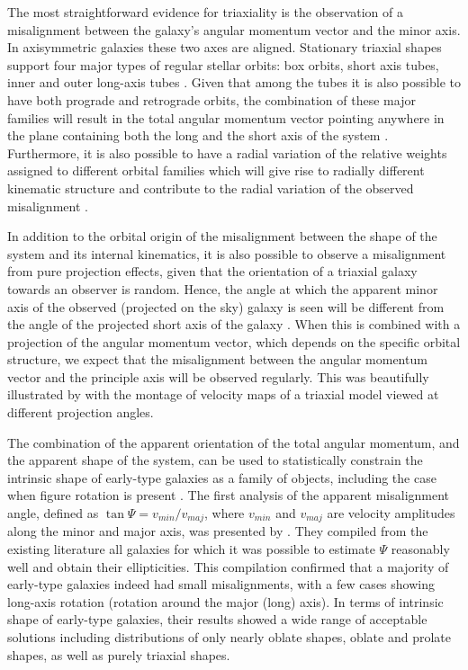 \documentclass[usenatbib,usegraphicx]{mn2e}
\begin{document}
The most straightforward evidence for triaxiality is the observation of a misalignment between the galaxy's angular momentum vector and the minor axis. In axisymmetric galaxies these two axes are aligned. Stationary triaxial shapes support four major types of regular stellar orbits: box orbits, short axis tubes, inner and outer long-axis tubes \citep{1985MNRAS.216..273D}. Given that among the tubes it is also possible to have both prograde and retrograde orbits, the combination of these major families will result in the total angular momentum vector pointing anywhere in the plane containing both the long and the short axis of the system \citep[e.g.][]{1987ApJ...321..113S}. Furthermore, it is also possible to have a radial variation of the relative weights assigned to different orbital families which will give rise to radially different kinematic structure and contribute to the radial variation of the observed misalignment \citep[see][for a detailed orbital analysis of a triaxial system]{2008MNRAS.385..647V}. 

In addition to the orbital origin of the misalignment between the shape of the system and its internal kinematics, it is also possible to observe a misalignment from pure projection effects, given that the orientation of a triaxial galaxy towards an observer is random. Hence, the angle at which the apparent minor axis of the observed (projected on the sky) galaxy is seen will be different from the angle of the projected short axis of the galaxy \citep{1956ZA.....39..126C,1977ApJ...213..368S,1979SvAL....5...37K}. When this is combined with a projection of the angular momentum vector, which depends on the specific orbital structure, we expect that the misalignment between the angular momentum vector and the principle axis will be observed regularly. This was beautifully illustrated by \citet{1991AJ....102..882S} with the montage of velocity maps of a triaxial model viewed at different projection angles. 

The combination of the apparent orientation of the total angular momentum, and the apparent shape of the system, can be used to statistically constrain the intrinsic shape of early-type galaxies as a family of objects, including the case when figure rotation is present \citep{1985MNRAS.212..767B}. The first analysis of the apparent misalignment angle, defined as $\tan \Psi = v_{min}/v_{maj}$, where $v_{min}$ and $v_{maj}$ are velocity amplitudes along the minor and major axis, was presented by \citet{1991ApJ...383..112F}. They compiled from the existing literature all galaxies for which it was possible to estimate $\Psi$ reasonably well and obtain their ellipticities. This compilation confirmed that a majority of early-type galaxies indeed had small misalignments,  with a few cases showing long-axis rotation (rotation around the major (long) axis). In terms of intrinsic shape of early-type galaxies, their results showed a wide range of acceptable solutions including distributions of only nearly oblate shapes, oblate and prolate shapes, as well as purely triaxial shapes.
\end{document}
